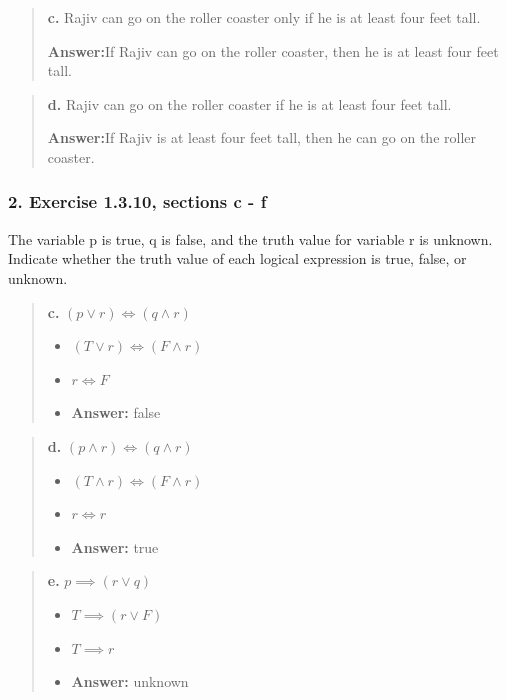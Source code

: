 \documentclass[11pt, oneside]{article}
\begin{document}
\begin{quote}
    \textbf{c. }Rajiv can go on the roller coaster only if he is at least four feet tall.

    \textbf{Answer:}\enspace If Rajiv can go on the roller coaster, then he is at least four feet tall.
\end{quote}

\begin{quote}
    \textbf{d. }Rajiv can go on the roller coaster if he is at least four feet tall.

    \textbf{Answer:}\enspace If Rajiv is at least four feet tall, then he can go on the roller coaster.
\end{quote}

\subsubsection*{2. Exercise 1.3.10, sections c - f}

The variable p is true, q is false, and the truth value for variable r is unknown. Indicate whether the truth value of each logical expression is true, false, or unknown.

\begin{quote}
    \textbf{c. }$(p \lor r) \iff (q \land r)$

    \begin{itemize}
        \item $(T \lor r) \iff (F \land r)$
        \item $r \iff F$
        \item \textbf{Answer:} false
    \end{itemize}
\end{quote}

\begin{quote}
    \textbf{d. }$(p \land r) \iff (q \land r)$

    \begin{itemize}
        \item $(T \land r) \iff (F \land r)$
        \item $r \iff r$
        \item \textbf{Answer:} true
    \end{itemize}
\end{quote}

\begin{quote}
    \textbf{e. }$p \implies (r \lor q)$

    \begin{itemize}
        \item $T \implies (r \lor F)$
        \item $T \implies r$
        \item \textbf{Answer:} unknown
    \end{itemize}
\end{quote}
\end{document}
